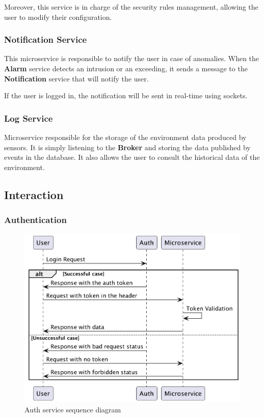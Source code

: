\documentclass{scrartcl}
\begin{document}
    Moreover, this service is in charge of the security rules management, allowing the user to modify their configuration.

    \subsubsection{Notification Service}
    This microservice is responsible to notify the user in case of anomalies.
    When the \textbf{Alarm} service detects an intrusion or an exceeding, it sends a message to the \textbf{Notification} service that will notify the user.

    If the user is logged in, the notification will be sent in real-time using sockets.

    \subsubsection{Log Service}
    Microservice responsible for the storage of the environment data produced by sensors.
    It is simply listening to the \textbf{Broker} and storing the data published by events in the database.
    It also allows the user to consult the historical data of the environment.

    \subsection{Interaction}

    \subsubsection{Authentication}
    \begin{figure}
        \centering
        \includegraphics[scale=0.3]{img/auth-service-sequence}
        \caption{Auth service sequence diagram}
        \label{fig:auth-service-sequence}
    \end{figure}
\end{document}
